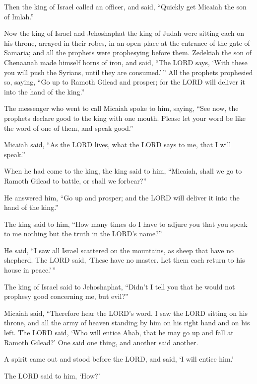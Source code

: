  Then the king of Israel called an officer, and said,
``Quickly get Micaiah the son of Imlah.''

 Now the king of Israel and Jehoshaphat the king of Judah
were sitting each on his throne, arrayed in their robes, in an open
place at the entrance of the gate of Samaria; and all the prophets were
prophesying before them.  Zedekiah the son of Chenaanah
made himself horns of iron, and said, ``The LORD says, `With these you
will push the Syrians, until they are consumed.'\,''  All
the prophets prophesied so, saying, ``Go up to Ramoth Gilead and
prosper; for the LORD will deliver it into the hand of the king.''

 The messenger who went to call Micaiah spoke to him,
saying, ``See now, the prophets declare good to the king with one mouth.
Please let your word be like the word of one of them, and speak good.''

 Micaiah said, ``As the LORD lives, what the LORD says to
me, that I will speak.''

 When he had come to the king, the king said to him,
``Micaiah, shall we go to Ramoth Gilead to battle, or shall we
forbear?''

He answered him, ``Go up and prosper; and the LORD will deliver it into
the hand of the king.''

 The king said to him, ``How many times do I have to
adjure you that you speak to me nothing but the truth in the LORD's
name?''

 He said, ``I saw all Israel scattered on the mountains,
as sheep that have no shepherd. The LORD said, `These have no master.
Let them each return to his house in peace.'\,''

 The king of Israel said to Jehoshaphat, ``Didn't I tell
you that he would not prophesy good concerning me, but evil?''

 Micaiah said, ``Therefore hear the LORD's word. I saw
the LORD sitting on his throne, and all the army of heaven standing by
him on his right hand and on his left.  The LORD said,
`Who will entice Ahab, that he may go up and fall at Ramoth Gilead?' One
said one thing, and another said another.

 A spirit came out and stood before the LORD, and said,
`I will entice him.'

 The LORD said to him, `How?'

